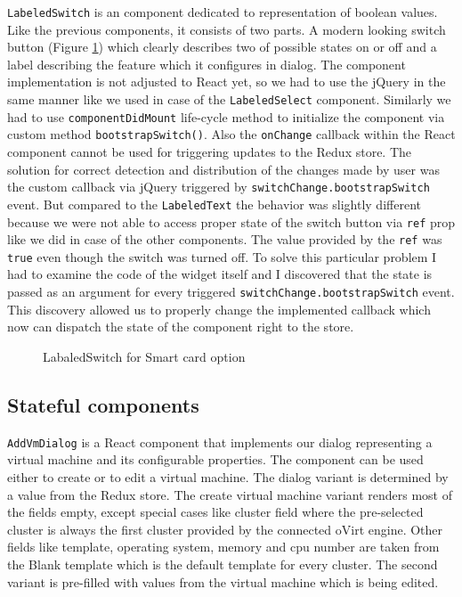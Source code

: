 \texttt{LabeledSwitch} is an component dedicated to representation of boolean values. Like the previous components, it consists of two parts. A modern looking switch button (Figure \ref{switch}) which clearly describes two of possible states on or off and a label describing the feature which it configures in dialog. The component implementation is not adjusted to React yet, so we had to use the jQuery in the same manner like  we used in case of the \texttt{LabeledSelect} component. Similarly we had to use \texttt{componentDidMount} life-cycle method to initialize the component via custom method \texttt{bootstrapSwitch()}. Also the \texttt{onChange} callback within the React component cannot be used for triggering updates to the Redux store. The solution for correct detection and distribution of the changes made by user was the custom callback via jQuery triggered by \texttt{switchChange.bootstrapSwitch} event. But compared to the \texttt{LabeledText} the behavior was slightly different because we were not able to access proper state of the switch button via \texttt{ref} prop like we did in case of the other components. The value provided by the \texttt{ref} was \texttt{true} even though the switch was turned off. To solve this particular problem I had to examine the code of the widget itself and I discovered that the state is passed as an argument for every triggered \texttt{switchChange.bootstrapSwitch} event. This discovery allowed us to properly change the implemented callback which now can dispatch the state of the component right to the store.

\begin{figure}[h]
\caption{LabaledSwitch for Smart card option}
\label{switch}
\end{figure}

\subsection{Stateful components}
\texttt{AddVmDialog} is a React component that implements our dialog representing a virtual machine and its configurable properties. The component can be used either to create or to edit a virtual machine. The dialog variant is determined by a value from the Redux store. The create virtual machine variant renders most of the fields empty, except special cases like cluster field where the pre-selected cluster is always the first cluster provided by the connected oVirt engine. Other fields like template, operating system, memory and cpu number are taken from the Blank template which is the default template for every cluster. The second variant is pre-filled with values from the virtual machine which is being edited.
 
